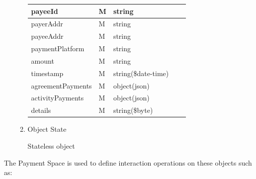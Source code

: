 \begin{enumerate}
\begin{enumerate}
\begin{table}[H]
\begin{center}
\begin{tabular}{|p{3cm}|l|p{3cm}|p{3cm}|p{4cm}|}
payeeId				& M & string				&							&							\\
\hline

payerAddr			& M & string				&							&							\\
\hline

payeeAddr			& M & string				&							&							\\
\hline

paymentPlatform		& M & string				&							&							\\
\hline

amount				& M & string				&							&							\\
\hline

timestamp			& M & string(\$date-time)	&							&							\\
\hline

agreementPayments	& M & object(json)			&							&							\\
\hline

activityPayments	& M & object(json)			&							&							\\
\hline
	
details				& M & string(\$byte)		&							&							\\
\hline

\end{tabular}
\end{center}
\end{table}

\item Object State

Stateless object

\end{enumerate}

\end{enumerate}


The Payment Space is used to define interaction operations on these objects such as:

